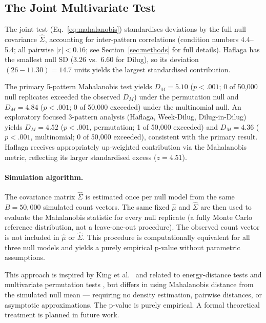 \documentclass[12pt]{article}
\begin{document}
\subsection{The Joint Multivariate Test}

The joint test (Eq.~\ref{eq:mahalanobis}) standardises deviations by the full null
covariance $\hat{\Sigma}$, accounting for inter-pattern correlations (condition numbers
4.4--5.4; all pairwise $|r| < 0.16$; see Section~\ref{sec:methods} for full details).
Haflaga has the smallest null SD (3.26 vs.\ 6.60 for Dilug), so its deviation
$(26 - 11.30) = 14.7$ units yields the largest standardised contribution.

The primary 5-pattern Mahalanobis test yields $D_M = 5.10$ ($p < .001$;
0 of 50,000 null replicates exceeded the observed $D_M$) under the permutation null
and $D_M = 4.84$ ($p < .001$; 0 of 50,000 exceeded) under the multinomial null.
An exploratory focused 3-pattern analysis (Haflaga, Week-Dilug, Dilug-in-Dilug)
yields $D_M = 4.52$ ($p < .001$, permutation; 1 of 50,000 exceeded) and $D_M = 4.36$
($p < .001$, multinomial; 0 of 50,000 exceeded), consistent with the primary result.
Haflaga receives appropriately up-weighted contribution via the Mahalanobis metric,
reflecting its larger standardised excess ($z = 4.51$).

\paragraph{Simulation algorithm.}
The covariance matrix $\hat{\Sigma}$ is estimated once per null model from the same
$B = 50{,}000$ simulated count vectors. The same fixed $\hat{\mu}$ and
$\hat{\Sigma}$ are then used to evaluate the Mahalanobis statistic for every null
replicate (a fully Monte Carlo reference distribution, not a leave-one-out
procedure). The observed count vector is not included in $\hat{\mu}$ or
$\hat{\Sigma}$. This procedure is computationally equivalent for all three null models
and yields a purely empirical p-value without parametric assumptions.

This approach is inspired by King et al.\ \cite{king2018} and related to
energy-distance tests \cite{szekely2013} and multivariate permutation tests
\cite{pesarin2010}, but differs in using Mahalanobis distance from the simulated
null mean --- requiring no density estimation, pairwise distances, or asymptotic
approximations. The p-value is purely empirical. A formal theoretical treatment is
planned in future work.
\end{document}
